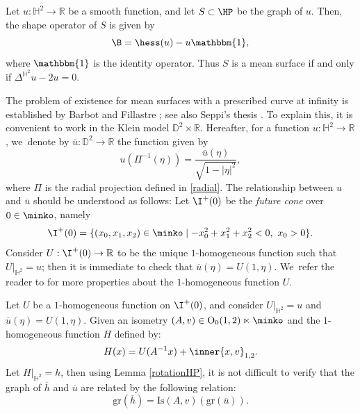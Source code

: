 \begin{lemma}\label{Shapeoperator_of_graph}
Let $u:\mathbb{H}^2\to\mathbb{R}$ be a smooth function, and let $S\subset\HP$ be the graph of $u$. Then, the shape operator of $S$ is given by
\[
\B=\hess(u)-u\mathbbm{1},
\]
where $\mathbbm{1}$ is the identity operator. Thus $S$ is a mean surface if and only if $\Delta^{\mathbb{H}^2} u-2u=0$.
\end{lemma}
The problem of existence for mean surfaces with a prescribed curve at infinity is established by Barbot and Fillastre \cite{barbotfillastre}; see also Seppi's thesis \cite[Chap.\,9]{Seppi_thesis}. To explain this, it is convenient to work in the Klein model $\mathbb{D}^2\times\mathbb{R}$. Hereafter, for a function $u:\mathbb{H}^2\to\mathbb{R}$, we~denote by $\overline{u}:\mathbb{D}^2\to\mathbb{R}$ the function given by
\begin{equation}\label{u_et_u_bar}
u(\Pi^{-1}(\eta))=\frac{\overline{u}(\eta)}{\sqrt{1-\lvert\eta\rvert^2}},
\end{equation} where $\Pi$ is the radial projection defined in \eqref{radial}. The relationship between $u$ and $\overline{u}$ should be understood as follows: Let $\I^+(0)$ be the \emph{future cone} over $0\in\minko$, namely
\[
\I^+(0)=\{(x_0,x_1,x_2)\in\minko\mid -x_0^2+x_1^2+x_2^2<0,\ x_0>0 \}.
\]
Consider $U:\I^{+}(0)\to\mathbb{R}$ to be the unique $1$-homogeneous function such that $U|_{\mathbb{H}^2}=u$; then it is immediate to check that $\overline{u}(\eta)=U(1,\eta)$. We~refer the reader to \cite{françois_vernolli} for more properties about the $1$-homogeneous function $U$.

\begin{remark}
Let $U$ be a $1$-homogeneous function on $\I^{+}(0)$, and consider $U|_{\mathbb{H}^2}=u$ and $\overline{u}(\eta)=U(1,\eta)$. Given an isometry $(A,v)\in\mathrm{O}_0(1,2)\ltimes\minko$ and the $1$-homogeneous function $H$ defined by:
\[
H(x)=U(A^{-1}x)+\inner{x,v}_{1,2}.
\]Let $H|_{\mathbb{H}^2}=h$, then using Lemma \ref{rotationHP}, it is not difficult to verify that the graph of $\overline{h}$ and $\overline{u}$ are related by the following relation:
\begin{equation}\label{h_et_h_bar}
\mathrm{gr}(\overline{h})=\mathrm{Is}(A,v)(\mathrm{gr}(\overline{u})).
\end{equation}
\end{remark}

